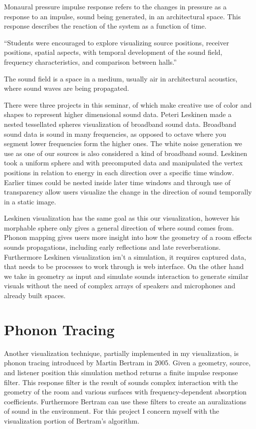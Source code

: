 \documentclass{thesis}
\begin{document}
Monaural pressure impulse response refers to the changes in pressure as a response to an impulse, sound being generated, in an architectural space. This response describes the reaction of the system as a function of time.

“Students were encouraged to explore visualizing source positions, receiver positions, spatial aspects, with temporal development of the sound field, frequency characteristics, and comparison between halls.” 

The sound field is a space in a medium, usually air in architectural acoustics, where sound waves are being propagated.

There were three projects in this seminar, of which make creative use of color and shapes to represent higher dimensional sound data. Peteri Leskinen made a nested tessellated spheres visualization of broadband sound data.  Broadband sound data is sound in many frequencies, as opposed to octave where you segment lower frequencies form the higher ones. The white noise generation we use as one of our sources is also considered a kind of broadband sound.
Leskinen took a uniform sphere and with precomputed data and manipulated the vertex positions in relation to energy in each direction over a specific time window. Earlier times could be nested inside later time windows and through use of transparency allow users visualize the change in the direction of sound temporally in a static image.

Leskinen visualization has the same goal as this our visualization, however his morphable sphere only gives a general direction of where sound comes from. Phonon mapping gives users more insight into how the geometry of a room effects sounds propagations, including early reflections and late reverberations.  Furthermore Leskinen visualization isn’t a simulation, it requires captured data, that needs to be processes to work through is web interface.  On the other hand we take in geometry as input and simulate sounds interaction to generate similar visuals without the need of complex arrays of speakers and microphones and already built spaces. 

\section{Phonon Tracing}

Another visualization technique, partially implemented in my visualization, is phonon tracing \cite{bertram} introduced by Martin Bertram in 2005. Given a geometry, source, and listener position this simulation method returns a finite impulse response filter. This response filter is the result of sounds complex interaction with the geometry of the room and various surfaces with frequency-dependent absorption coefficients. Furthermore Bertram can use these filters to create an auralizations of sound in the environment. For this project I concern myself with the visualization portion of Bertram’s algorithm. 
\end{document}
